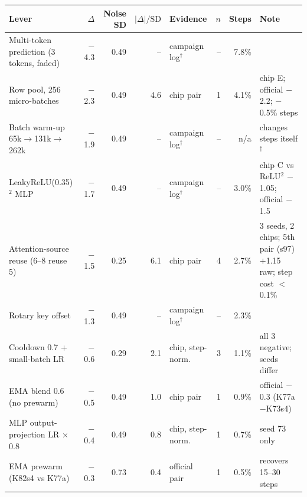 {\footnotesize\setlength{\tabcolsep}{4pt}
\begin{tabular}{@{}p{4.2cm}rrrlrrp{3.3cm}@{}}
\toprule
Lever & $\Delta$ & Noise SD & $|\Delta|/\text{SD}$ & Evidence & $n$ & Steps & Note \\
\midrule
Multi-token prediction (3 tokens, faded) & \ensuremath{-}4.3 & 0.49 & -- & campaign log$^{\dagger}$ & -- & 7.8\% &  \\
Row pool, 256 micro-batches & \ensuremath{-}2.3 & 0.49 & 4.6 & chip pair & 1 & 4.1\% & chip E; official $-$2.2; $-$0.5\% steps \\
Batch warm-up 65k$\to$131k$\to$262k & \ensuremath{-}1.9 & 0.49 & -- & campaign log$^{\dagger}$ & -- & n/a & changes steps itself$^{\ddagger}$ \\
LeakyReLU(0.35)$^2$ MLP & \ensuremath{-}1.7 & 0.49 & -- & campaign log$^{\dagger}$ & -- & 3.0\% & chip C vs ReLU$^2$ $-$1.05; official $-$1.5 \\
Attention-source reuse (6--8 reuse 5) & \ensuremath{-}1.5 & 0.25 & 6.1 & chip pair & 4 & 2.7\% & 3 seeds, 2 chips; 5th pair (s97) $+$1.15 raw; step cost $<$0.1\% \\
Rotary key offset & \ensuremath{-}1.3 & 0.49 & -- & campaign log$^{\dagger}$ & -- & 2.3\% &  \\
Cooldown 0.7 + small-batch LR & \ensuremath{-}0.6 & 0.29 & 2.1 & chip, step-norm. & 3 & 1.1\% & all 3 negative; seeds differ \\
EMA blend 0.6 (no prewarm) & \ensuremath{-}0.5 & 0.49 & 1.0 & chip pair & 1 & 0.9\% & official $-$0.3 (K77a$-$K73s4) \\
MLP output-projection LR $\times$0.8 & \ensuremath{-}0.4 & 0.49 & 0.8 & chip, step-norm. & 1 & 0.7\% & seed 73 only \\
EMA prewarm (K82s4 vs K77a) & \ensuremath{-}0.3 & 0.73 & 0.4 & official pair & 1 & 0.5\% & recovers 15--30 steps \\
\bottomrule
\end{tabular}
}

